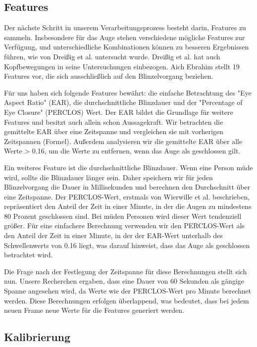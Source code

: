 \subsection{Features}
\label{sec:features}

Der nächste Schritt in unserem Verarbeitungsprozess besteht darin, Features zu sammeln. Insbesondere für das Auge stehen verschiedene mögliche Features zur Verfügung, und unterschiedliche Kombinationen können zu besseren Ergebnissen führen, wie von Dreißig et al. \cite{DREI} untersucht wurde. Dreißig et al. hat auch Kopfbewegungen in seine Untersuchungen einbezogen. Aich Ebrahim \cite{EB16} stellt 19 Features vor, die sich ausschließlich auf den Blinzelvorgang beziehen.

Für uns haben sich folgende Features bewährt: die einfache Betrachtung des "Eye Aspect Ratio" (EAR), die durchschnittliche Blinzdauer und der "Percentage of Eye Closure" (PERCLOS) Wert. Der EAR bildet die Grundlage für weitere Features und besitzt auch allein schon Aussagekraft. Wir betrachten die gemittelte EAR über eine Zeitspanne und vergleichen sie mit vorherigen Zeitspannen (Formel). Außerdem analysieren wir die gemittelte EAR über alle Werte > 0.16, um die Werte zu entfernen, wenn das Auge als geschlossen gilt.

Ein weiteres Feature ist die durchschnittliche Blinzdauer. Wenn eine Person müde wird, sollte die Blinzdauer länger sein. Daher speichern wir für jeden Blinzelvorgang die Dauer in Millisekunden und berechnen den Durchschnitt über eine Zeitspanne.
Der PERCLOS-Wert, erstmals von Wierwille et al. \cite{WI94} beschrieben, repräsentiert den Anteil der Zeit in einer Minute, in der die Augen zu mindestens 80 Prozent geschlossen sind. Bei müden Personen wird dieser Wert tendenziell größer. Für eine einfachere Berechnung verwenden wir den PERCLOS-Wert als den Anteil der Zeit in einer Minute, in der der EAR-Wert unterhalb des Schwellenwerts von 0.16 liegt, was darauf hinweist, dass das Auge als geschlossen betrachtet wird.

Die Frage nach der Festlegung der Zeitspanne für diese Berechnungen stellt sich nun. Unsere Recherchen ergaben, dass eine Dauer von 60 Sekunden als gängige Spanne angesehen wird, da Werte wie der PERCLOS-Wert pro Minute berechnet werden. Diese Berechnungen erfolgen überlappend, was bedeutet, dass bei jedem neuen Frame neue Werte für die Features generiert werden.

\subsection{Kalibrierung}
\label{sec:calibration}

